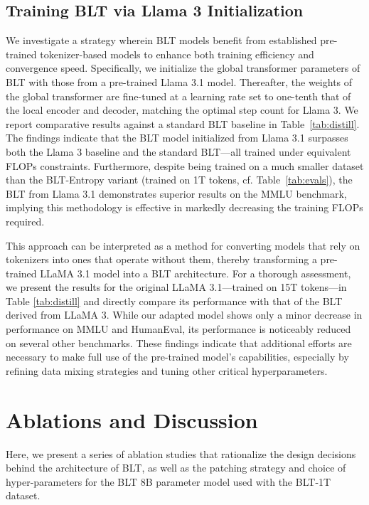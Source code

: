 \subsection{Training {\textsc BLT} via Llama 3 Initialization}
\label{sec:distillation}
We investigate a strategy wherein {\textsc BLT} models benefit from established pre-trained tokenizer-based models to enhance both training efficiency and convergence speed. Specifically, we initialize the global transformer parameters of {\textsc BLT} with those from a pre-trained Llama 3.1 model. Thereafter, the weights of the global transformer are fine-tuned at a learning rate set to one-tenth that of the local encoder and decoder, matching the optimal step count for Llama 3. We report comparative results against a standard {\textsc BLT} baseline in Table~\ref{tab:distill}. The findings indicate that the {\textsc BLT} model initialized from Llama 3.1 surpasses both the Llama 3 baseline and the standard {\textsc BLT}—all trained under equivalent FLOPs constraints. Furthermore, despite being trained on a much smaller dataset than the {\textsc BLT}-Entropy variant (trained on 1T tokens, cf. Table~\ref{tab:evals}), the {\textsc BLT} from Llama 3.1 demonstrates superior results on the MMLU benchmark, implying this methodology is effective in markedly decreasing the training FLOPs required.

This approach can be interpreted as a method for converting models that rely on tokenizers into ones that operate without them, thereby transforming a pre-trained LLaMA 3.1 model into a {\textsc BLT} architecture. For a thorough assessment, we present the results for the original LLaMA 3.1—trained on 15T tokens—in Table \ref{tab:distill} and directly compare its performance with that of the {\textsc BLT} derived from LLaMA 3. While our adapted model shows only a minor decrease in performance on MMLU and HumanEval, its performance is noticeably reduced on several other benchmarks. These findings indicate that additional efforts are necessary to make full use of the pre-trained model’s capabilities, especially by refining data mixing strategies and tuning other critical hyperparameters.

\section{Ablations and Discussion}
\label{section:ablations}
Here, we present a series of ablation studies that rationalize the design decisions behind the architecture of {\textsc BLT}, as well as the patching strategy and choice of hyper-parameters for the {\textsc BLT} 8B parameter model used with the {\textsc BLT}-1T dataset.

